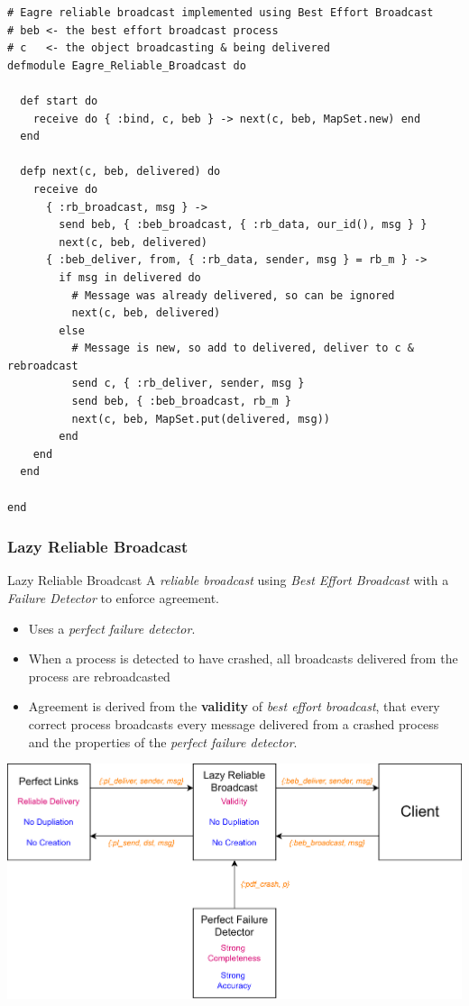 \begin{verbatim}
# Eagre reliable broadcast implemented using Best Effort Broadcast
# beb <- the best effort broadcast process
# c   <- the object broadcasting & being delivered
defmodule Eagre_Reliable_Broadcast do

  def start do
    receive do { :bind, c, beb } -> next(c, beb, MapSet.new) end
  end

  defp next(c, beb, delivered) do
    receive do
      { :rb_broadcast, msg } ->
        send beb, { :beb_broadcast, { :rb_data, our_id(), msg } }
        next(c, beb, delivered)
      { :beb_deliver, from, { :rb_data, sender, msg } = rb_m } ->
        if msg in delivered do
          # Message was already delivered, so can be ignored
          next(c, beb, delivered)
        else
          # Message is new, so add to delivered, deliver to c & rebroadcast
          send c, { :rb_deliver, sender, msg }
          send beb, { :beb_broadcast, rb_m }
          next(c, beb, MapSet.put(delivered, msg))
        end
    end
  end

end
\end{verbatim}

\subsubsection{Lazy Reliable Broadcast}
\begin{definitionbox}{Lazy Reliable Broadcast}
    A \textit{reliable broadcast} using \textit{Best Effort Broadcast} with a \textit{Failure Detector} to enforce agreement.
    \begin{itemize}
        \item Uses a \textit{perfect failure detector}.
        \item When a process is detected to have crashed, all broadcasts delivered from the process are rebroadcasted
        \item Agreement is derived from the \textbf{validity} of \textit{best effort broadcast}, that every correct process broadcasts every message delivered from a crashed process and the properties of the \textit{perfect failure detector}.
    \end{itemize}
\end{definitionbox}

\begin{center}
  \includegraphics[width=.8\textwidth]{reliable_broadcast/images/lazy_reliable_broadcast.drawio.png}
\end{center}

